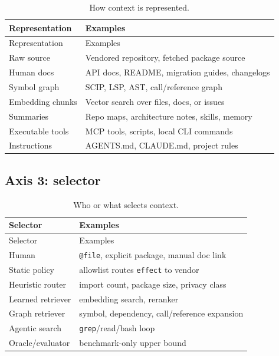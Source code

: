 \documentclass[
  11pt,
  letterpaper,
  numbers=noendperiod,
  parskip=half]{scrartcl}
\begin{document}
\begin{longtable}[]{@{}ll@{}}
\caption{How context is
represented.}\label{tbl-representation}\tabularnewline
\toprule\noalign{}
Representation & Examples \\
\midrule\noalign{}
\endfirsthead
\toprule\noalign{}
Representation & Examples \\
\midrule\noalign{}
\endhead
\bottomrule\noalign{}
\endlastfoot
Raw source & Vendored repository, fetched package source \\
Human docs & API docs, README, migration guides, changelogs \\
Symbol graph & SCIP, LSP, AST, call/reference graph \\
Embedding chunks & Vector search over files, docs, or issues \\
Summaries & Repo maps, architecture notes, skills, memory \\
Executable tools & MCP tools, scripts, local CLI commands \\
Instructions & AGENTS.md, CLAUDE.md, project rules \\
\end{longtable}

\subsection{Axis 3: selector}\label{sec-axis-selector}

\begin{longtable}[]{@{}ll@{}}
\caption{Who or what selects
context.}\label{tbl-selector}\tabularnewline
\toprule\noalign{}
Selector & Examples \\
\midrule\noalign{}
\endfirsthead
\toprule\noalign{}
Selector & Examples \\
\midrule\noalign{}
\endhead
\bottomrule\noalign{}
\endlastfoot
Human & \texttt{@file}, explicit package, manual doc link \\
Static policy & allowlist routes \texttt{effect} to vendor \\
Heuristic router & import count, package size, privacy class \\
Learned retriever & embedding search, reranker \\
Graph retriever & symbol, dependency, call/reference expansion \\
Agentic search & \texttt{grep}/read/bash loop \\
Oracle/evaluator & benchmark-only upper bound \\
\end{longtable}
\end{document}

